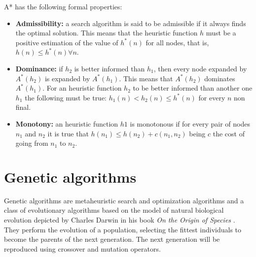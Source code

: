 \documentclass[]{llncs}
\begin{document}
A* has the following formal properties:
\begin{itemize}
    \item \textbf{Admissibility:} a search algorithm is said to be admissible if it always finds the optimal solution. This means that the heuristic function $h$ must be a positive estimation of the value of $h^{*}(n)$ for all nodes, that is, $h(n) \leq h^{*}(n) \forall n$. 
    \item \textbf{Dominance:} if $h_2$ is better informed than $h_1$, then every node expanded by $A^{*}(h_2)$ is expanded by $A^{*}(h_1)$. This means that $A^{*}(h_2)$ dominates $A^{*}(h_1)$. For an heuristic function $h_2$ to be better informed than another one $h_1$ the following must be true: $h_1(n) < h_2(n) \leq h^{*}(n)$ for every $n$ non final.
    \item \textbf{Monotony:} an heuristic function $h1$ is monotonous if for every pair of nodes $n_1$ and $n_2$ it is true that $h(n_1) \leq h(n_2) + c(n_1, n_2)$ being $c$ the cost of going from $n_1$ to $n_2$.
\end{itemize}
\section{Genetic algorithms}\label{gen_algs}
Genetic algorithms \cite{ag_tutorial} are metaheuristic search and optimization algorithms and a class of evolutionary algorithms based on the model of natural biological evolution depicted by Charles Darwin in his book \textit{On the Origin of Species} \cite{darwin}. They perform the evolution of a population, selecting the fittest individuals to become the parents of the next generation. The next generation will be reproduced using crossover and mutation operators.
\end{document}
